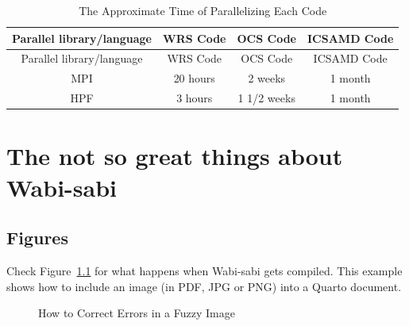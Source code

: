 \documentclass[
  dissertation]{bsu-cs}
\begin{document}
\begin{longtable}[]{@{}cccc@{}}
\caption{The Approximate Time of Parallelizing Each
Code}\label{tbl-table4}\tabularnewline
\toprule\noalign{}
Parallel library/language & WRS Code & OCS Code & ICSAMD Code \\
\midrule\noalign{}
\endfirsthead
\toprule\noalign{}
Parallel library/language & WRS Code & OCS Code & ICSAMD Code \\
\midrule\noalign{}
\endhead
\bottomrule\noalign{}
\endlastfoot
MPI & 20 hours & 2 weeks & 1 month \\
HPF & 3 hours & 1 1/2 weeks & 1 month \\
\end{longtable}

\chapter{The not so great things about Wabi-sabi}

\section{Figures}\label{figures}

Check Figure~\ref{fig-fuzzyImage} for what happens when Wabi-sabi gets
compiled. This example shows how to include an image (in PDF, JPG or
PNG) into a Quarto document.

\begin{figure}


\caption{\label{fig-fuzzyImage}How to Correct Errors in a Fuzzy Image}

\end{figure}%
\end{document}
